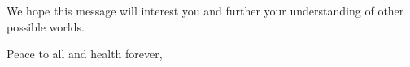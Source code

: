 We hope this message will interest you and further your understanding of other possible worlds. 

Peace to all and health forever, 







